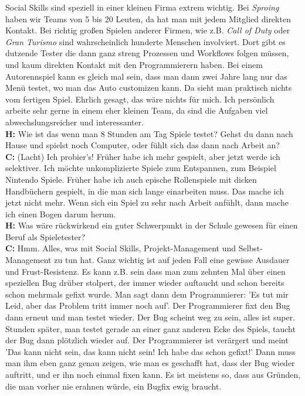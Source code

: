 \documentclass[10pt,a4paper,ngerman,twoside]{article} %
\begin{document}
\begin{multicols}{3}
Social Skills sind speziell in einer kleinen Firma extrem wichtig. Bei \textit{Sproing} haben wir Teams von 5 bis 20 Leuten, da hat man mit jedem Mitglied direkten Kontakt. Bei richtig großen Spielen anderer Firmen, wie z.B. \textit{Call of Duty} oder \textit{Gran Turismo} sind wahrscheinlich hunderte Menschen involviert. Dort gibt es dutzende Tester die dann ganz streng Prozessen und Workflows folgen müssen, und kaum direkten Kontakt mit den Programmierern haben. Bei einem  Autorennspiel kann es gleich mal sein, dass  man dann zwei Jahre lang nur das Menü testet, wo man das Auto customizen kann. Da sieht man praktisch nichts vom fertigen Spiel. Ehrlich gesagt, das wäre nichts für mich. Ich persönlich arbeite sehr gerne in einem eher kleinen Team, da sind die Aufgaben viel abwechslungsreicher und interessanter. \\
\textbf{H:} Wie ist das wenn man 8 Stunden am Tag Spiele testet? Gehst du dann nach Hause und spielst noch Computer, oder fühlt sich das dann nach Arbeit an? \\
\textbf{C:} (Lacht) Ich probier's! Früher habe ich mehr gespielt, aber jetzt werde ich selektiver. Ich möchte unkomplizierte Spiele zum Entspannen, zum Beispiel Nintendo Spiele. Früher habe ich auch epische Rollenspiele mit dicken Handbüchern gespielt, in die man sich lange einarbeiten muss. Das mache ich jetzt nicht mehr. Wenn sich ein Spiel zu sehr nach Arbeit anfühlt, dann mache ich einen Bogen darum herum. \\
\textbf{H:} Was wäre rückwirkend ein guter Schwerpunkt in der Schule gewesen für einen Beruf als Spieletester? \\
\textbf{C:} Hmm. Alles, was mit Social Skills, Projekt-Management und Selbst-Management zu tun hat. Ganz wichtig ist auf jeden Fall eine gewisse Ausdauer und Frust-Resistenz. Es kann z.B. sein dass man zum zehnten Mal über einen speziellen Bug drüber stolpert, der immer wieder auftaucht und schon bereits schon mehrmals gefixt wurde. Man sagt dann dem Programmierer: 'Es tut mir Leid, aber das Problem tritt immer noch auf'. Der Programmierer fixt den Bug dann erneut und man testet wieder. Der Bug scheint weg zu sein, alles ist super. Stunden später, man testet gerade an einer ganz anderen Ecke des Spiels, taucht der Bug dann plötzlich wieder auf. Der Programmierer ist verärgert und meint 'Das kann nicht sein, das kann nicht sein! Ich habe das schon gefixt!' Dann muss man ihm eben ganz genau zeigen, wie man es geschafft hat, dass der Bug wieder auftritt, und er ihn noch einmal fixen kann. Es ist meistens so, dass aus Gründen, die man vorher nie erahnen würde, ein Bugfix ewig braucht. \\

\end{multicols}
\end{document}
